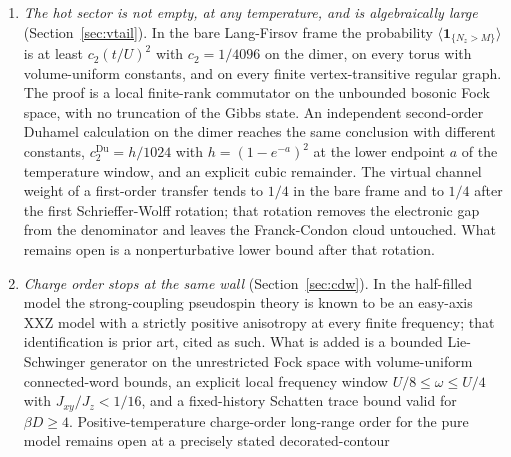 \documentclass[11pt]{article}
\theoremstyle{definition}
\theoremstyle{remark}
\begin{document}
\begin{enumerate}[label=(\Alph*),leftmargin=2.2em]
\begin{equation}
\label{eq:dir}
\end{equation}
whose exponent is exactly the kind of narrowing one wants. The exact influence
action is recalled, including the displacement that the physical pair field
carries on its endpoints. But the weight of a chronological sequence of bond
charges does not factorize over disjoint time segments. An explicit legal
four-charge history exceeds the largest value any free directed block can take,
by an interval-enclosed margin of about $9.3$ at $U=40$, and by at least $3/4$ for
every $U/\Omega\ge20$ at $\beta\Omega=1$. A closed four-hop pair-return loop
costs total action at most $3$ regardless of $U/\Omega$. A facing-plateau lemma
does survive, with constant $3/22$, but its cost is local and does not add along a
skeleton.
\item \emph{The hot sector is not empty, at any temperature, and is
algebraically large} (Section~\ref{sec:vtail}). In the bare Lang-Firsov frame
the probability $\langle\mathbf{1}_{\{N_{z}>M\}}\rangle$ is at least
$c_{2}(t/U)^{2}$ with $c_{2}=1/4096$ on the dimer, on every torus with
volume-uniform constants, and on every finite vertex-transitive regular graph.
The proof is a local finite-rank commutator on the unbounded bosonic Fock space,
with no truncation of the Gibbs state. An independent second-order Duhamel
calculation on the dimer reaches the same conclusion with different constants,
$c_{2}^{\mathrm{Du}}=h/1024$ with $h=(1-e^{-a})^{2}$ at the lower endpoint $a$ of
the temperature window, and an explicit cubic remainder. The virtual channel weight of a first-order transfer tends to
$1/4$ in the bare frame and to $1/4$ after the first Schrieffer-Wolff rotation;
that rotation removes the electronic gap from the denominator and leaves the
Franck-Condon cloud untouched. What remains open is a nonperturbative lower bound
after that rotation.
\item \emph{Charge order stops at the same wall} (Section~\ref{sec:cdw}). In the
half-filled model the strong-coupling pseudospin theory is known to be an easy-axis
XXZ model with a strictly positive anisotropy at every finite frequency; that
identification is prior art, cited as such. What is added is a bounded
Lie-Schwinger generator on the unrestricted Fock space with volume-uniform
connected-word bounds, an explicit local frequency window
$U/8\le\omega\le U/4$ with $J_{xy}/J_{z}<1/16$, and a fixed-history Schatten
trace bound valid for $\beta D\ge4$. Positive-temperature charge-order long-range
order for the pure model remains open at a precisely stated decorated-contour

\end{enumerate}
\end{document}
